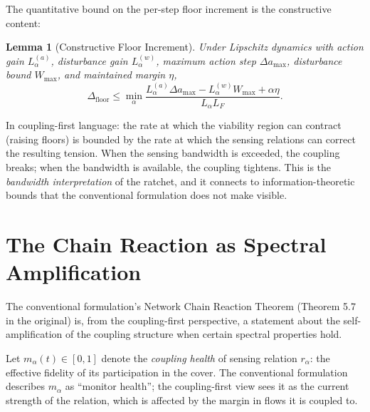 \documentclass[11pt]{article}
\newtheorem{lemma}[theorem]{Lemma}
\theoremstyle{definition}
\theoremstyle{remark}
\begin{document}
The quantitative bound on the per-step floor increment is the constructive content:
\begin{lemma}[Constructive Floor Increment]
\label{lem:floor-increment}
Under Lipschitz dynamics with action gain $L_\alpha^{(a)}$, disturbance gain $L_\alpha^{(w)}$, maximum action step $\Delta a_{\max}$, disturbance bound $W_{\max}$, and maintained margin $\eta$,
\begin{equation}
\Delta_{\mathrm{floor}} \leq \min_\alpha \frac{L_\alpha^{(a)} \Delta a_{\max} - L_\alpha^{(w)} W_{\max} + \alpha \eta}{L_\alpha L_F}.
\end{equation}
\end{lemma}

In coupling-first language: the rate at which the viability region can contract (raising floors) is bounded by the rate at which the sensing relations can correct the resulting tension. When the sensing bandwidth is exceeded, the coupling breaks; when the bandwidth is available, the coupling tightens. This is the \emph{bandwidth interpretation} of the ratchet, and it connects to information-theoretic bounds that the conventional formulation does not make visible.

\section{The Chain Reaction as Spectral Amplification}

The conventional formulation's Network Chain Reaction Theorem (Theorem 5.7 in the original) is, from the coupling-first perspective, a statement about the self-amplification of the coupling structure when certain spectral properties hold.

Let $m_\alpha(t) \in [0,1]$ denote the \emph{coupling health} of sensing relation $r_\alpha$: the effective fidelity of its participation in the cover. The conventional formulation describes $m_\alpha$ as ``monitor health''; the coupling-first view sees it as the current strength of the relation, which is affected by the margin in flows it is coupled to.
\end{document}
